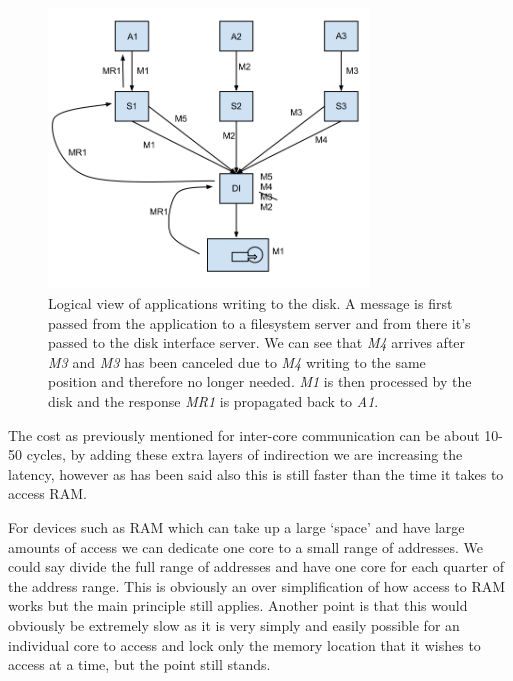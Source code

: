 \documentclass[journal]{IEEEtran}
\begin{document}
\begin{figure}
\includegraphics[height = 7.5cm, width=8.5cm]{MessagetoDisk.png}
\caption{Logical view of applications writing to the disk. A message is first passed from the application to a filesystem server and from there it's passed to the disk interface server. We can see that \emph{M4} arrives after \emph{M3} and \emph{M3} has been canceled due to \emph{M4} writing to the same position and therefore no longer needed. \emph{M1} is then processed by the disk and the response \emph{MR1} is propagated back to \emph{A1}.}
\label{MessageToDisk}
\end{figure}

The cost as previously mentioned for inter-core communication can be about 10-50 cycles, by adding these extra layers of indirection we are increasing the latency, however as has been said also this is still faster than the time it takes to access RAM. 

For devices such as RAM which can take up a large `space' and have large amounts of access we can dedicate one core to a small range of addresses. We could say divide the full range of addresses and have one core for each quarter of the address range. This is obviously an over simplification of how access to RAM works but the main principle still applies. Another point is that this would obviously be extremely slow as it is very simply and easily possible for an individual core to access and lock only the memory location that it wishes to access at a time, but the point still stands.
\end{document}
